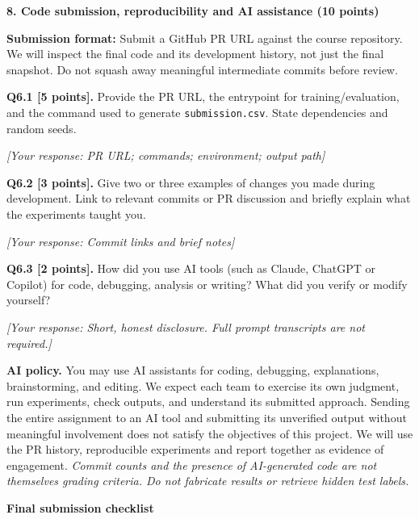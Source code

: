 \documentclass[11pt,letterpaper]{article}
\begin{document}
\vspace{12pt}
{\large\textbf{8. Code submission, reproducibility and AI assistance (10 points)}}
\vspace{2pt}

\textbf{Submission format:} Submit a GitHub PR URL against the course repository. We will inspect the final code and its development history, not just the final snapshot. Do not squash away meaningful intermediate commits before review.

\vspace{6pt}
\textbf{Q6.1 [5 points].} Provide the PR URL, the entrypoint for training/evaluation, and the command used to generate \texttt{submission.csv}. State dependencies and random seeds.

\textit{[Your response: PR URL; commands; environment; output path]}

\vspace{6pt}
\textbf{Q6.2 [3 points].} Give two or three examples of changes you made during development. Link to relevant commits or PR discussion and briefly explain what the experiments taught you.

\textit{[Your response: Commit links and brief notes]}

\newpage

\textbf{Q6.3 [2 points].} How did you use AI tools (such as Claude, ChatGPT or Copilot) for code, debugging, analysis or writing? What did you verify or modify yourself?

\textit{[Your response: Short, honest disclosure. Full prompt transcripts are not required.]}

\vspace{12pt}
\textbf{AI policy.} You may use AI assistants for coding, debugging, explanations, brainstorming, and editing. We expect each team to exercise its own judgment, run experiments, check outputs, and understand its submitted approach. Sending the entire assignment to an AI tool and submitting its unverified output without meaningful involvement does not satisfy the objectives of this project. We will use the PR history, reproducible experiments and report together as evidence of engagement. \textit{Commit counts and the presence of AI-generated code are not themselves grading criteria. Do not fabricate results or retrieve hidden test labels.}

\vspace{18pt}
{\large\textbf{Final submission checklist}}
\vspace{6pt}
\end{document}
